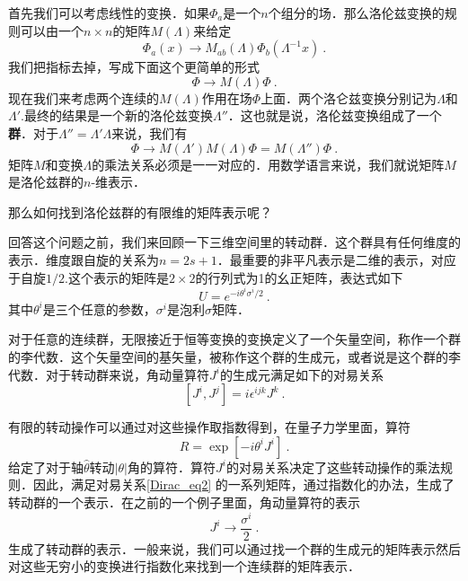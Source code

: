 首先我们可以考虑线性的变换．如果$\Phi_a$是一个$n$个组分的场．那么洛伦兹变换的规则可以由一个$n\times n$的矩阵$M(\Lambda)$来给定
\begin{equation}
\Phi_a (x) \rightarrow M_{ab} (\Lambda) \Phi_b(\Lambda^{-1} x)~.
\end{equation}
我们把指标去掉，写成下面这个更简单的形式
\begin{equation}
\Phi\rightarrow M(\Lambda)\Phi~.
\end{equation}
现在我们来考虑两个连续的$M(\Lambda)$作用在场$\Phi$上面．两个洛仑兹变换分别记为$\Lambda$和$\Lambda'$.最终的结果是一个新的洛伦兹变换$\Lambda''$．这也就是说，洛伦兹变换组成了一个\textbf{群}．对于$\Lambda''=\Lambda'\Lambda$来说，我们有
\begin{equation}
\Phi\rightarrow M(\Lambda')M(\Lambda)\Phi = M(\Lambda'')\Phi~.
\end{equation}
矩阵$M$和变换$\Lambda$的乘法关系必须是一一对应的．用数学语言来说，我们就说矩阵$M$是洛伦兹群的$n$-维表示．

那么如何找到洛伦兹群的有限维的矩阵表示呢？

回答这个问题之前，我们来回顾一下三维空间里的转动群．这个群具有任何维度的表示．维度跟自旋的关系为$n=2s+1$．最重要的非平凡表示是二维的表示，对应于自旋$1/2$.这个表示的矩阵是$2\times 2$的行列式为1的幺正矩阵，表达式如下
\begin{equation}
U = e^{-i\theta^i\sigma^i/2}~.
\end{equation} 
其中$\theta^i$是三个任意的参数，$\sigma^i$是泡利$\sigma$矩阵．

对于任意的连续群，无限接近于恒等变换的变换定义了一个矢量空间，称作一个群的李代数．这个矢量空间的基矢量，被称作这个群的生成元，或者说是这个群的李代数．对于转动群来说，角动量算符$J^i$的生成元满足如下的对易关系
\begin{equation}\label{Dirac_eq2}
[J^i,J^j] = i \epsilon^{ijk} J^k ~.
\end{equation}

有限的转动操作可以通过对这些操作取指数得到，在量子力学里面，算符
\begin{equation}
R = \exp [-i \theta^i J^i]~.
\end{equation}
给定了对于轴$\hat\theta$转动$|\theta|$角的算符．算符$J^i$的对易关系决定了这些转动操作的乘法规则．因此，满足对易关系\autoref{Dirac_eq2} 的一系列矩阵，通过指数化的办法，生成了转动群的一个表示．在之前的一个例子里面，角动量算符的表示
\begin{equation}
J^i \rightarrow \frac{\sigma^i}{2}~.
\end{equation}
生成了转动群的表示．一般来说，我们可以通过找一个群的生成元的矩阵表示然后对这些无穷小的变换进行指数化来找到一个连续群的矩阵表示．

